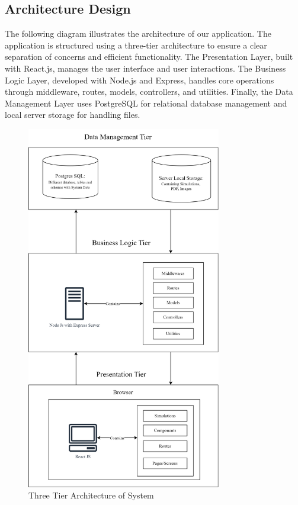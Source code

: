 \subsection{Architecture Design}
The following diagram illustrates the architecture of our application. The application is structured using a three-tier architecture to ensure a clear separation of concerns and efficient functionality. The Presentation Layer, built with React.js, manages the user interface and user interactions. The Business Logic Layer, developed with Node.js and Express, handles core operations through middleware, routes, models, controllers, and utilities. Finally, the Data Management Layer uses PostgreSQL for relational database management and local server storage for handling files.
\begin{figure}[H]
    \centering
    \includegraphics[height=16cm]{Diagrams/Main_Block.png}
    \caption{Three Tier Architecture of System}
\end{figure}

\newpage
